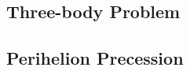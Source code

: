 \documentclass[../main.tex]{subfiles}
\begin{document}
\subsection{Three-body Problem}

\subsection{Perihelion Precession}
\end{document}
